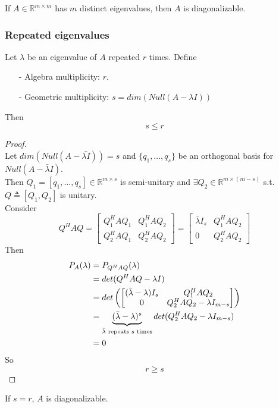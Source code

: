 \begin{multicols}{2}
If $A\in\mathbb{R}^{m\times m}$ has $m$ distinct eigenvalues, then $A$ is diagonalizable.

\subsubsection{Repeated eigenvalues}
Let $\lambda$ be an eigenvalue of $A$ repeated $r$ times. Define
\begin{itemize}
    \item [-] Algebra multiplicity: $r$.
    \item [-] Geometric multiplicity: $s=dim(Null(A-\lambda I))$
\end{itemize}
Then
\[
    s\leq r
\]
\begin{proof} \\
    Let $dim(Null(A-\bar{\lambda I}))=s$ and $\{q_1,...,q_s\}$ be an orthogonal basis for $Null(A-\bar{\lambda} I)$. \\
    Then $Q_1 = [q_1,...,q_s]\in\mathbb{R}^{m\times s}$ is semi-unitary and $\exists Q_2\in\mathbb{R}^{m\times (m-s)}$ s.t. 
    $Q\triangleq [Q_1,Q_2]$ is unitary.\\
    Consider 
    \[
        Q^HAQ = \begin{bmatrix}
            Q_1^H AQ_1 & Q_1^HAQ_2 \\
            Q_2^H AQ_1 & Q_2^HAQ_2
        \end{bmatrix} = \begin{bmatrix}
            \bar{\lambda} I_s & Q_1^HAQ_2 \\
            0 & Q_2^HAQ_2
        \end{bmatrix}
    \]
    Then
    \[
        \begin{aligned}
            P_A(\lambda) & =P_{Q^HAQ}(\lambda) \\
            & = det(Q^HAQ-\lambda I) \\
            & = det\left(\begin{bmatrix}
                (\bar{\lambda}-\lambda)I_s & Q_1^HAQ_2 \\
                0 & Q_2^HAQ_2-\lambda I_{m-s}
            \end{bmatrix}\right) \\
            & = \underbrace{(\bar{\lambda}-\lambda)^s}_{\bar{\lambda}\text{ \rm repeats } s \text{ \rm times}} det(Q_2^HAQ_2-\lambda I_{m-s}) \\
            & = 0
        \end{aligned}
    \]
    So \[r\geq s\]
\end{proof}
If $s=r$, $A$ is diagonalizable.

\newpage
\end{multicols}